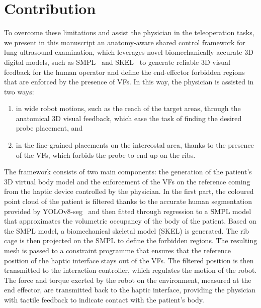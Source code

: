 
\section{Contribution}

\noindent To overcome these limitations and assist the physician in the teleoperation tasks, we present in this manuscript an anatomy-aware shared control framework for lung ultrasound examination, which leverages novel biomechanically accurate 3D digital models, such as SMPL~\cite{loper2015smpl} and SKEL~\cite{keller2023skel} to generate reliable 3D visual feedback for the human operator and define the end-effector forbidden regions that are enforced by the presence of VFs. In this way, the physician is assisted in two ways: \begin{enumerate}
    \item in wide robot motions, such as the reach of the target areas, through the anatomical 3D visual feedback, which ease the task of finding the desired probe placement, and
    \item in the fine-grained placements on the intercostal area, thanks to the presence of the VFs, which forbids the probe to end up on the ribs.
\end{enumerate}
The framework consists of two main components: the generation of the patient's 3D virtual body model and the enforcement of the VFs on the reference coming from the haptic device controlled by the physician. In the first part, the coloured point cloud of the patient is filtered thanks to the accurate human segmentation provided by YOLOv8-seg~\cite{jocher2023yolov8} and then fitted through regression to a SMPL model that approximates the volumetric occupancy of the body of the patient. Based on the SMPL model, a biomechanical skeletal model (SKEL) is generated. The rib cage is then projected on the SMPL to define the forbidden regions. The resulting mesh is passed to a constraint programme that ensures that the reference position of the haptic interface stays out of the VFs. The filtered position is then transmitted to the interaction controller, which regulates the motion of the robot. The force and torque exerted by the robot on the environment, measured at the end effector, are transmitted back to the haptic interface, providing the physician with tactile feedback to indicate contact with the patient's body.

